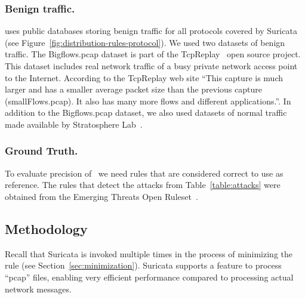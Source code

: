 \documentclass[sigconf,review, anonymous]{acmart}
\begin{document}
\subsubsection{Benign traffic.}\tname{} uses public databases storing benign
traffic for all protocols covered by Suricata (see
Figure~\ref{fig:distribution-rules-protocol}). We used two datasets of
benign traffic. The Bigflows.pcap dataset is part of the
TcpReplay~\cite{tcpreplay} open source project. This dataset includes
real network traffic of a busy private network access point to the
Internet. According to the TcpReplay web site ``This capture is much
larger and has a smaller average packet size than the previous capture
(smallFlows.pcap). It also has many more flows and different
applications.''. In addition to the Bigflows.pcap dataset, we also
used datasets of normal traffic made available by Stratosphere
Lab~\cite{stratosphere-normal}.

\subsubsection{Ground Truth.}To evaluate precision of \tname\ we
need rules that are considered correct to use as reference. The rules
that detect the attacks from Table~\ref{table:attacks} were obtained
from the Emerging Threats Open Ruleset~\cite{emerging-threats-open}.



\subsection{Methodology}


Recall that Suricata is invoked multiple times in the process of
minimizing the rule (see Section~\ref{sec:minimization}). Suricata
supports a feature to process ``pcap'' files, enabling very efficient
performance compared to processing actual network messages.
  

\end{document}

